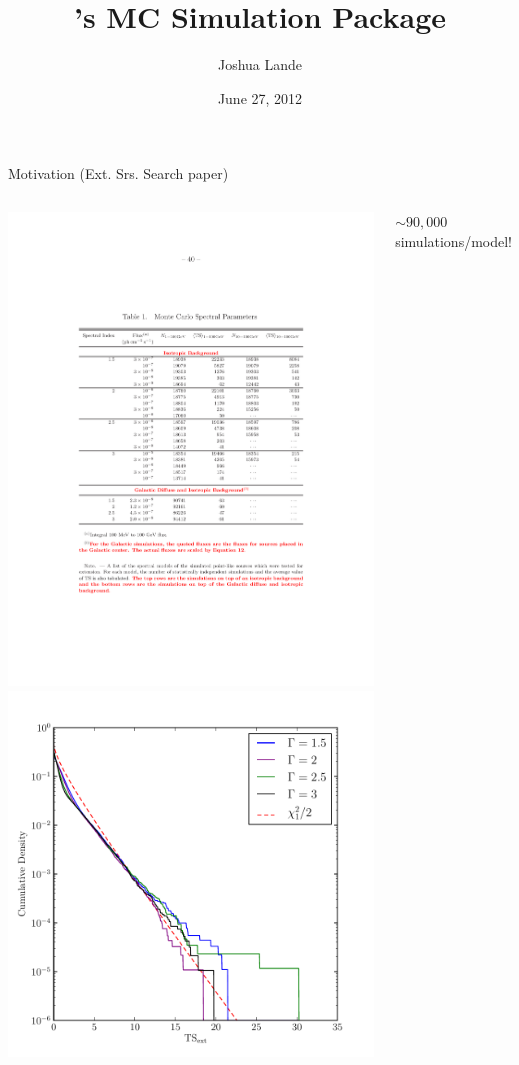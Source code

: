 \documentclass[12pt]{beamer}
\title{\pointlike's MC Simulation Package}
\author{Joshua Lande}
\date{June 27, 2012}
\begin{document}
\fermititle


\begin{frame}{Motivation (Ext. Srs. Search paper)}
\begin{columns}
  \includegraphics[scale=0.4]{plots/ext_src_table.pdf}
  \includegraphics[scale=0.45]{plots/ext_src_plot.pdf}

  $\sim90,000$ simulations/model!
\end{columns}
\end{frame}
\end{document}

